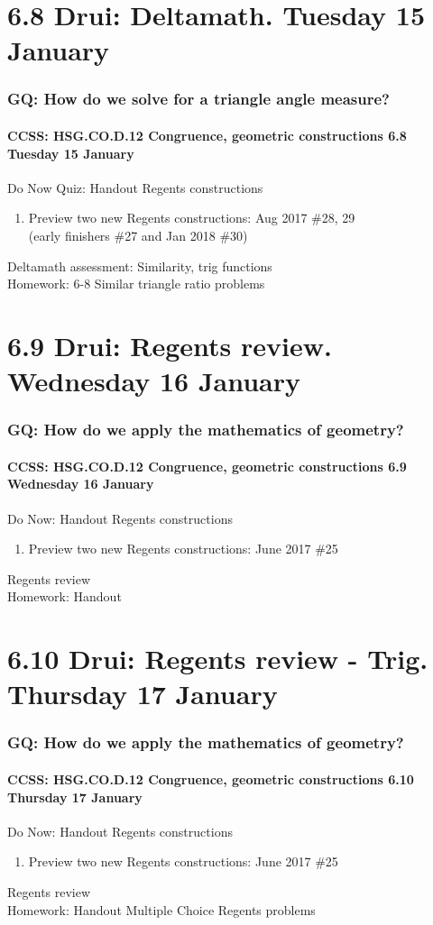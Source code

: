 \documentclass{beamer}
\begin{document}
\section{6.8 Drui: Deltamath. Tuesday 15 January}
  \frame
  {
    \frametitle{GQ: How do we solve for a triangle angle measure?}
    \framesubtitle{CCSS: HSG.CO.D.12 Congruence, geometric constructions  \alert{6.8 Tuesday 15 January}}

    \begin{block}{Do Now Quiz: Handout Regents constructions}
      \begin{enumerate}
        \item Preview two new Regents constructions: Aug 2017 \#28, 29\\ (early finishers \#27 and Jan 2018 \#30)
      \end{enumerate}
    \end{block}
    Deltamath assessment: Similarity, trig functions\\
    Homework: 6-8 Similar triangle ratio problems
  }

\section{6.9 Drui: Regents review. Wednesday 16 January}
  \frame
  {
    \frametitle{GQ: How do we apply the mathematics of geometry?}
    \framesubtitle{CCSS: HSG.CO.D.12 Congruence, geometric constructions  \alert{6.9 Wednesday 16 January}}

    \begin{block}{Do Now: Handout Regents constructions}
      \begin{enumerate}
        \item Preview two new Regents constructions: June 2017 \#25
      \end{enumerate}
    \end{block}
    Regents review\\[0.5cm]
    Homework: Handout
  }

\section{6.10 Drui: Regents review - Trig. Thursday 17 January}
  \frame
  {
    \frametitle{GQ: How do we apply the mathematics of geometry?}
    \framesubtitle{CCSS: HSG.CO.D.12 Congruence, geometric constructions  \alert{6.10 Thursday 17 January}}

    \begin{block}{Do Now: Handout Regents constructions}
      \begin{enumerate}
        \item Preview two new Regents constructions: June 2017 \#25
      \end{enumerate}
    \end{block}
    Regents review\\[0.5cm]
    Homework: Handout Multiple Choice Regents problems
  }
\end{document}
